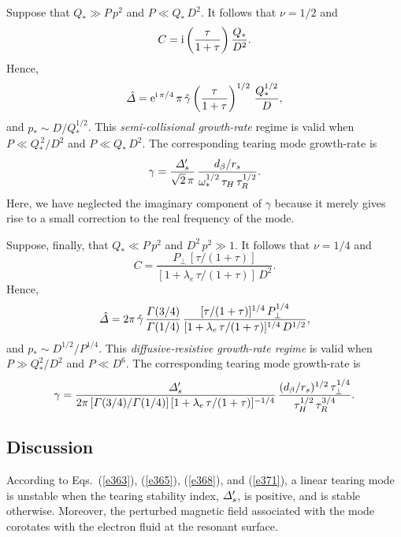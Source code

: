 \documentclass[12pt,prb,aps]{revtex4-1}
\begin{document}
Suppose that $Q_\ast\gg P\,p^2$ and $P\ll Q_\ast\,D^2$. It follows that $\nu=1/2$ and
\begin{equation}
C = {\rm i}\left(\frac{\tau}{1+\tau}\right)\frac{Q_\ast}{D^2}.
\end{equation} 
Hence, 
\begin{equation}
\hat{\mit\Delta} = {\rm e}^{{\rm i}\,\pi/4}\,\pi\,\hat{\gamma}\left(\frac{\tau}{1+\tau}\right)^{1/2}\,\frac{Q_\ast^{1/2}}{D},
\end{equation}
and $p_\ast\sim D/Q_\ast^{1/2}$. This  {\em semi-collisional growth-rate}\/ regime is valid when $P\ll Q_\ast^{\,2}/D^2$ and
$P\ll Q_\ast\,D^2$. 
The corresponding tearing mode growth-rate is
\begin{equation}\label{e368}
\gamma = \frac{{\mit\Delta}_s'}{\sqrt{2}\,\pi}\,\frac{d_\beta/r_s}{\omega_\ast^{1/2}\,\tau_H\,\tau_R^{1/2}}.
\end{equation}
Here, we have neglected the imaginary component of $\gamma$ because it merely gives rise to a small correction to the
real frequency of the mode. 

Suppose, finally, that $Q_\ast \ll P\,p^2$ and $D^2\,p^2\gg 1$. It follows that $\nu=1/4$ and
\begin{equation}
C = \frac{P_\perp\,[\tau/(1+\tau)]}{[1+\lambda_e\,\tau/(1+\tau)]\,D^2}.
\end{equation} 
Hence,
\begin{equation} 
\hat{\mit\Delta} = 2\pi\,\hat{\gamma}\,\frac{{\mit\Gamma}(3/4)}{{\mit\Gamma}(1/4)}\,\frac{[\tau/(1+\tau)]^{1/4}\,P_\perp^{1/4}}{[1+\lambda_e\,\tau/(1+\tau)]^{1/4}\,D^{1/2}},
\end{equation}
and $p_\ast \sim D^{1/2}/P^{1/4}$. This {\em diffusive-resistive growth-rate regime}\/ is valid when $P\gg Q_\ast^2/D^2$ and
$P\ll D^6$. The corresponding tearing mode growth-rate is 
\begin{equation}\label{e371}
\gamma= \frac{{\mit\Delta}_s'}{2\pi\,[{\mit\Gamma}(3/4)/{\mit\Gamma}(1/4)]\,[1+\lambda_e\,\tau/(1+\tau)]^{-1/4}}\,\frac{(d_\beta/r_s)^{1/2}\,\tau_\perp^{1/4}}{\tau_H^{1/2}\,\tau_R^{3/4}}.
\end{equation}

\subsection{Discussion}
According to Eqs.~(\ref{e363}), (\ref{e365}), (\ref{e368}), and (\ref{e371}), a linear tearing mode is unstable when the tearing stability index, ${\mit\Delta}_s'$, is positive, and is stable otherwise.\cite{fkr}
Moreover, the perturbed magnetic field associated with the mode corotates with the electron fluid at the resonant surface.\cite{ara} 
\end{document}
